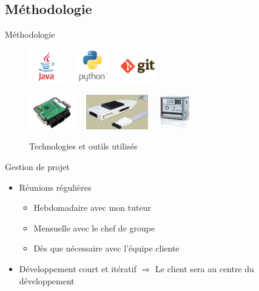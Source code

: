 \subsection{Méthodologie}
\begin{frame}{Méthodologie}
	\begin{figure}[H]
		\centering
		\includegraphics[height=1.5cm]{images/java.png}~~
		\includegraphics[height=1.5cm]{images/python.png}~~
		\includegraphics[height=1.5cm]{images/git.jpg}

		\includegraphics[height=1.5cm]{images/ecu.jpg}~~
		\includegraphics[height=1.5cm]{images/t32.jpg}~~
		\includegraphics[height=1.5cm]{images/dspace.jpg}
		\caption{Technologies et outils utilisés}
	\end{figure}
	\vfill
	\pause
\vspace{-20px}
	\begin{block}{Gestion de projet}
		\begin{itemize}
			\item Réunions régulières
			\begin{itemize}
				\item Hebdomadaire avec mon tuteur
				\item Mensuelle avec le chef de groupe
				\item Dès que nécessaire avec l'équipe cliente
			\end{itemize}

			\item Développement court et itératif\newline
				\footnotesize $\Rightarrow$ Le client sera au centre du développement
		\end{itemize}
			\end{block}
\end{frame}
